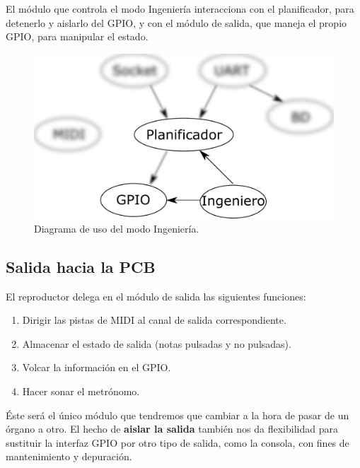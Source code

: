 El módulo que controla el modo Ingeniería interacciona con el planificador, para detenerlo y aislarlo del \acrshort{GPIO}, y con el módulo de salida, que maneja el propio \acrshort{GPIO}, para manipular el estado.

\smallskip

\begin{figure}[H]
	\noindent \begin{centering}
		\includegraphics[width=\linewidth/2]{capitulo4/daemon_engineer}
		\par\end{centering}
	\smallskip
	\caption{\label{fig:daemon_engineer} Diagrama de uso del modo Ingeniería.}
\end{figure} 

\smallskip

\subsection{Salida hacia la PCB}
\label{subsec:output}

El reproductor delega en el módulo de salida las siguientes funciones:

\begin{enumerate}
	\item Dirigir las pistas de \acrshort{MIDI} al canal de salida correspondiente.
	\item Almacenar el estado de salida (notas pulsadas y no pulsadas).
	\item Volcar la información en el \acrshort{GPIO}.
	\item Hacer sonar el metrónomo.
\end{enumerate}

Éste será el único módulo que tendremos que cambiar a la hora de pasar de un órgano a otro. El hecho de \textbf{aislar la salida} también nos da flexibilidad para sustituir la interfaz \acrshort{GPIO} por otro tipo de salida, como la consola, con fines de mantenimiento y depuración.

